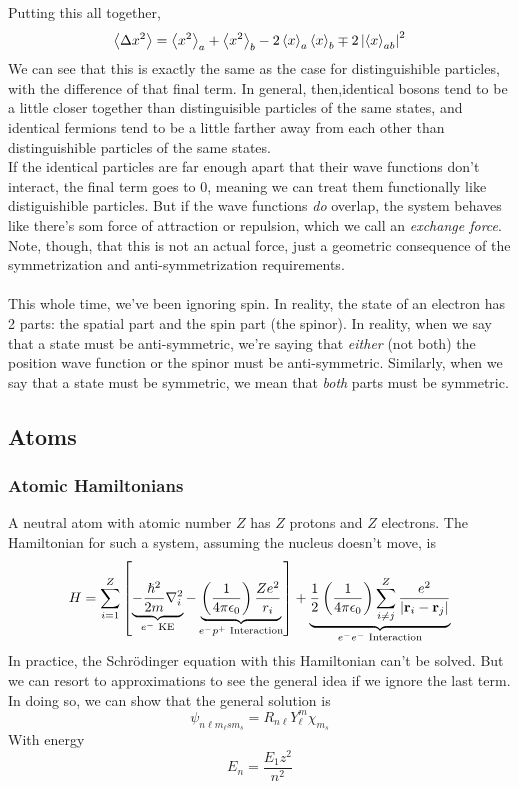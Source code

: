 \documentclass[a4paper]{article}
\begin{document}
	Putting this all together,
	\[
		\left\langle \Delta x^2\right\rangle = 
		\left\langle x^2\right\rangle_a + \left\langle x^2\right\rangle_b - 2\left\langle x\right\rangle_a\left\langle x\right\rangle_b \mp
		2\left\lvert \left\langle x\right\rangle_{ab}\right\rvert^2
	\]
	We can see that this is exactly the same as the case for
	distinguishible particles, with the difference of that final term.
	In general, then,identical bosons tend to be a little closer together
	than distinguisible particles of the same states, and
	identical fermions tend to be a	little farther away from each other
	than distinguishible particles of the same states.\\
	If the identical particles are far enough apart that their wave
	functions don't interact, the final term goes to 0, meaning we can
	treat them functionally like distiguishible particles. But if the
	wave functions \emph{do} overlap, the system behaves like there's som
	force of attraction or repulsion, which we call an \emph{exchange
	force}. Note, though, that this is not an actual force, just a
	geometric consequence of the symmetrization and anti-symmetrization
	requirements.\\~\\
	This whole time, we've been ignoring spin. In reality, the state of
	an electron has 2 parts: the spatial part and the spin part (the
	spinor). In reality, when we say that a state must be anti-symmetric,
	we're saying that \emph{either} (not both) the position wave function
	or the spinor must be anti-symmetric.
	Similarly, when we say that a state must be symmetric, we mean that
	\emph{both} parts must be symmetric.

\subsection{Atoms}
\subsubsection{Atomic Hamiltonians}
A neutral atom with atomic number $Z$ has $Z$ protons and $Z$ electrons.
The Hamiltonian for such a system, assuming the nucleus doesn't move, is
\[
	H =
	\sum_{i=1}^Z\left[
		\underbrace{
			-\frac{\hslash^2}{2m} \nabla^2_i
		}_{e^-\text{ KE}} -
		\underbrace{
			\left(\frac{1}{4\pi\epsilon_0}\right) \frac{Ze^2}{r_i}
		}_{e^-p^+\text{ Interaction}}
	\right] +
	\underbrace{
		\frac{1}{2} \left(\frac{1}{4\pi\epsilon_0}\right)
		\sum_{i \neq j}^Z
			\frac{e^2}{\left\lvert \boldsymbol{\mathbf{r}}_i-\boldsymbol{\mathbf{r}}_j\right\rvert}
		}_{e^-e^-\text{ Interaction}}
\]
In practice, the Schr\"odinger equation with this Hamiltonian can't be solved.
But we can resort to approximations to see the general idea if we ignore the
last term. In doing so, we can show that the general solution is
\[ \psi_{n\ell m_\ell s m_s} = R_{n\ell}Y_\ell^m\chi_{m_s} \]
With energy
\[ E_n = \frac{E_1z^2}{n^2} \]
\end{document}
